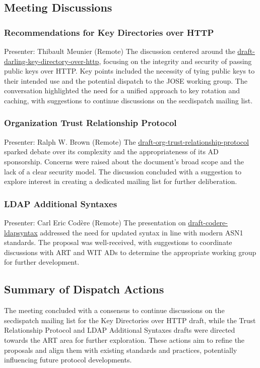 \documentclass{article}
\begin{document}
\subsection{Meeting Discussions}

\subsubsection{Recommendations for Key Directories over HTTP}
Presenter: Thibault Meunier (Remote)  
The discussion centered around the \href{https://datatracker.ietf.org/doc/draft-darling-key-directory-over-http/}{draft-darling-key-directory-over-http}, focusing on the integrity and security of passing public keys over HTTP. Key points included the necessity of tying public keys to their intended use and the potential dispatch to the JOSE working group. The conversation highlighted the need for a unified approach to key rotation and caching, with suggestions to continue discussions on the secdispatch mailing list.

\subsubsection{Organization Trust Relationship Protocol}
Presenter: Ralph W. Brown (Remote)  
The \href{https://datatracker.ietf.org/doc/draft-org-trust-relationship-protocol/}{draft-org-trust-relationship-protocol} sparked debate over its complexity and the appropriateness of its AD sponsorship. Concerns were raised about the document's broad scope and the lack of a clear security model. The discussion concluded with a suggestion to explore interest in creating a dedicated mailing list for further deliberation.

\subsubsection{LDAP Additional Syntaxes}
Presenter: Carl Eric Codère (Remote)  
The presentation on \href{https://datatracker.ietf.org/doc/draft-codere-ldapsyntax/}{draft-codere-ldapsyntax} addressed the need for updated syntax in line with modern ASN1 standards. The proposal was well-received, with suggestions to coordinate discussions with ART and WIT ADs to determine the appropriate working group for further development.

\subsection{Summary of Dispatch Actions}
The meeting concluded with a consensus to continue discussions on the secdispatch mailing list for the Key Directories over HTTP draft, while the Trust Relationship Protocol and LDAP Additional Syntaxes drafts were directed towards the ART area for further exploration. These actions aim to refine the proposals and align them with existing standards and practices, potentially influencing future protocol developments.
\end{document}
